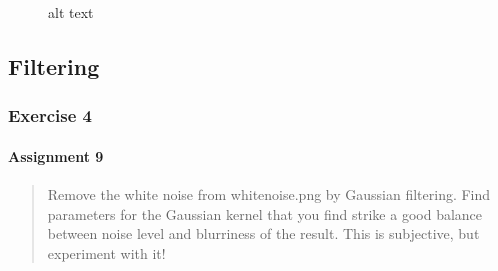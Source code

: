 \documentclass[11pt]{article}
\begin{document}
    \begin{figure}
\centering
{}
\caption{alt text}
\end{figure}

    \subsection{Filtering}\label{filtering}

    \subsubsection{Exercise 4}\label{exercise-4}

\paragraph{Assignment 9}\label{assignment-9}

\begin{quote}
Remove the white noise from whitenoise.png by Gaussian filtering. Find
parameters for the Gaussian kernel that you find strike a good balance
between noise level and blurriness of the result. This is subjective,
but experiment with it!
\end{quote}
\end{document}

